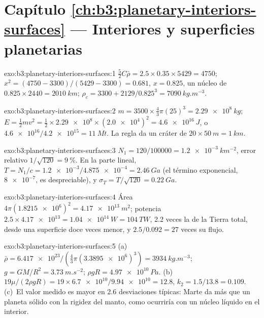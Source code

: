 \section*{Capítulo \ref{ch:b3:planetary-interiors-surfaces} --- Interiores y superficies planetarias}

\begin{solution}{exo:b3:planetary-interiors-surfaces:1}
$\tfrac52C\bar\rho = 2.5\times0.35\times5429 = 4750$; $x^2 = (4750 -
3300)/(5429 - 3300) = 0.681$, $x = 0.825$, un núcleo de $0.825\times2440 =
\qty{2010}{km}$; $\rho_c = 3300 + 2129/0.825^3 = \qty{7090}{kg.m^{-3}}$.
\end{solution}

\begin{solution}{exo:b3:planetary-interiors-surfaces:2}
$m = 3500\times\tfrac43\pi(25)^3 = \qty{2.29e8}{kg}$; $E = \tfrac12 m v^2 =
\tfrac12\times\num{2.29e8}\times(\num{2.0e4})^2 = \qty{4.6e16}{J}$, o
$\num{4.6e16}/\num{4.2e15} = \qty{11}{Mt}$. La regla da un cráter de
$20\times\qty{50}{m} = \qty{1}{km}$.
\end{solution}

\begin{solution}{exo:b3:planetary-interiors-surfaces:3}
$N_1 = 120/\num{100000} = \qty{1.2e-3}{km^{-2}}$, error relativo $1/\sqrt{120}
= \qty{9}{\percent}$. En la parte lineal, $T = N_1/c = \num{1.2e-3}/\num{4.875e-4}
= \qty{2.46}{Ga}$ (el término exponencial, $\num{8e-7}$, es despreciable), y
$\sigma_T = T/\sqrt{120} = \qty{0.22}{Ga}$.
\end{solution}

\begin{solution}{exo:b3:planetary-interiors-surfaces:4}
Área $4\pi(\num{1.8215e6})^2 = \qty{4.17e13}{m^2}$; potencia $2.5\times
\num{4.17e13} = \qty{1.04e14}{W} = \qty{104}{TW}$, 2.2 veces la de la Tierra
total, desde una superficie doce veces menor, y $2.5/0.092 = 27$ veces su
flujo.
\end{solution}

\begin{solution}{exo:b3:planetary-interiors-surfaces:5}
(a)~$\bar\rho = \num{6.417e23}/(\tfrac43\pi(\num{3.3895e6})^3) =
\qty{3934}{kg.m^{-3}}$; $g = GM/R^2 = \qty{3.73}{m.s^{-2}}$; $\rho gR =
\qty{4.97e10}{Pa}$. (b)~$19\mu/(2\rho gR) = 19\times\num{6.7e10}/\num{9.94e10}
= 12.8$, $k_2 = 1.5/13.8 = 0.109$. (c)~El valor medido es mayor en
2.6 desviaciones típicas: Marte da más que un planeta sólido con
la rigidez del manto, como ocurriría con un núcleo líquido en el interior.
\end{solution}

